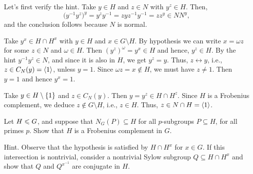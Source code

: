 \begin{solution} Let's first verify the hint. Take $y\in H$ and $z\in N$ with $y^z\in H$. Then,
$$
    \big(y^{-1}y^z\big)^y
        =y^zy^{-1}
        =zyz^{-1}y^{-1}
        =zz^y\in NN^y,
$$
and the conclusion follows because $N$ is normal.
\begin{description}[leftmargin=!,labelwidth=\widthof{\it if:}]
    \item[\textrm{\rm{\it if\/} part:}] Take $y^x\in H\cap H^x$ with $y
    \in H$ and $x\in G\setminus H$. By hypothesis we can write $x=\omega z$ for some $z\in N$ and $\omega\in H$. Then $(y^z)^\omega=y^x\in H$ and hence, $y^z\in H$. By the hint $y^{-1}y^z\in N$, and since it is also in $H$, we get $y^z=y$. Thus, $z\leftrightarrow y$, i.e., $z\in C_N(y)=\langle1\rangle$, unless $y=1$. Since $\omega z=x\notin H$, we must have $z\ne1$. Then $y=1$ and hence $y^x=1$.
    \item[\textrm{\rm{\it only if\/}:}]  Take $y\in H\setminus\{1\}$ and $z\in C_N(y)$. Then $y=y^z\in H\cap H^z$. Since $H$ is a Frobenius complement, we deduce $z\notin G\setminus H$, i.e., $z\in H$. Thus, $z\in N\cap H=\langle1\rangle$.
\end{description}
\end{solution}

\begin{probl}
    Let $H\leqslant G$, and suppose that $N_G(P)\subseteq H$ for all $p$-subgroups $P \subseteq H$, for all primes $p$. Show that\/ $H$ is a Frobenius complement in\/ $G$.

    \textrm{\rm Hint. Observe that the hypothesis is satisfied by $H \cap H^x$ for $x \in G$. If this intersection is nontrivial, consider a nontrivial Sylow subgroup $Q \subseteq H \cap H^x$ and show that $Q$ and $Q^{x^{-1}}$ are conjugate in $H$.}
\end{probl}

